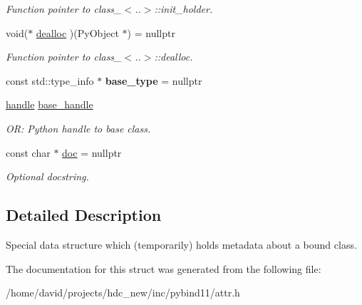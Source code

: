 \begin{DoxyCompactItemize}
\begin{DoxyCompactList}\small\item\em Function pointer to class\+\_\+$<$..$>$\+::init\+\_\+holder. \end{DoxyCompactList}\item 
void($\ast$ \hyperlink{structtype__record_ae2ac4793bffbccfdc2744749d6e2bb61}{dealloc} )(Py\+Object $\ast$) = nullptr\hypertarget{structtype__record_ae2ac4793bffbccfdc2744749d6e2bb61}{}\label{structtype__record_ae2ac4793bffbccfdc2744749d6e2bb61}

\begin{DoxyCompactList}\small\item\em Function pointer to class\+\_\+$<$..$>$\+::dealloc. \end{DoxyCompactList}\item 
const std\+::type\+\_\+info $\ast$ {\bfseries base\+\_\+type} = nullptr\hypertarget{structtype__record_a5d016dea5e167c35c568c32f9ebe176e}{}\label{structtype__record_a5d016dea5e167c35c568c32f9ebe176e}

\item 
\hyperlink{classhandle}{handle} \hyperlink{structtype__record_a17a15059f09b0e791b9cfd7674993f12}{base\+\_\+handle}\hypertarget{structtype__record_a17a15059f09b0e791b9cfd7674993f12}{}\label{structtype__record_a17a15059f09b0e791b9cfd7674993f12}

\begin{DoxyCompactList}\small\item\em OR\+: Python handle to base class. \end{DoxyCompactList}\item 
const char $\ast$ \hyperlink{structtype__record_ab343e48279172cd6f8ed5a25036bd02b}{doc} = nullptr\hypertarget{structtype__record_ab343e48279172cd6f8ed5a25036bd02b}{}\label{structtype__record_ab343e48279172cd6f8ed5a25036bd02b}

\begin{DoxyCompactList}\small\item\em Optional docstring. \end{DoxyCompactList}\end{DoxyCompactItemize}


\subsection{Detailed Description}
Special data structure which (temporarily) holds metadata about a bound class. 

The documentation for this struct was generated from the following file\+:\begin{DoxyCompactItemize}
\item 
/home/david/projects/hdc\+\_\+new/inc/pybind11/attr.\+h\end{DoxyCompactItemize}

